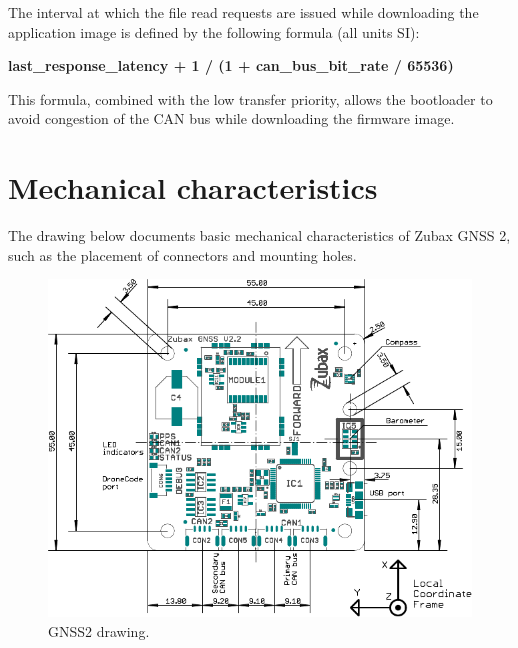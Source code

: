 \documentclass{zubaxdoc}
\begin{document}
The interval at which the file read requests are issued while downloading the application image is defined by the following formula (all units SI):

\textbf{last{\_}response{\_}latency + 1 / (1 + can{\_}bus{\_}bit{\_}rate / 65536)}

This formula, combined with the low transfer priority, allows the bootloader to avoid congestion of the CAN bus while downloading the firmware image.

\chapter{Mechanical characteristics}
The drawing below documents basic mechanical  characteristics of Zubax GNSS 2, such as the
placement of connectors and mounting holes.
\begin{figure}[!hbt]
	\centerline{\includegraphics[width=1.1\textwidth]{GNSS2_drawing}}
	\caption{GNSS2 drawing.\label{drawing}}
\end{figure}
\end{document}
